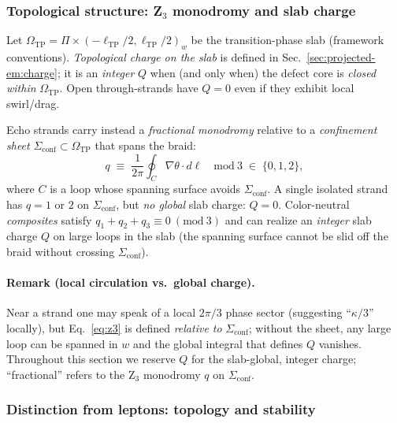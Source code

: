 \subsubsection{Topological structure: Z$_3$ monodromy and slab charge}
\label{sec:echo:topology}

Let $\Omega_{\mathrm{TP}}=\Pi\times(-\ell_{\mathrm{TP}}/2,\ell_{\mathrm{TP}}/2)_w$ be the transition-phase slab (framework conventions). \emph{Topological charge on the slab} is defined in Sec.~\ref{sec:projected-em:charge}; it is an \emph{integer} $Q$ when (and only when) the defect core is \emph{closed within} $\Omega_{\mathrm{TP}}$. Open through-strands have $Q=0$ even if they exhibit local swirl/drag.

Echo strands carry instead a \emph{fractional monodromy} relative to a \emph{confinement sheet} $\Sigma_{\mathrm{conf}}\subset\Omega_{\mathrm{TP}}$ that spans the braid:
\begin{equation}
q \;\equiv\; \frac{1}{2\pi}\oint_{C}\nabla\theta\!\cdot d\boldsymbol\ell \quad \mathrm{mod}\ 3 \;\in\;\{0,1,2\},
\label{eq:z3}
\end{equation}
where $C$ is a loop whose spanning surface avoids $\Sigma_{\mathrm{conf}}$. A single isolated strand has $q=1$ or $2$ on $\Sigma_{\mathrm{conf}}$, but \emph{no global} slab charge: $Q=0$. Color-neutral \emph{composites} satisfy $q_1+q_2+q_3\equiv 0\ (\mathrm{mod}\ 3)$ and can realize an \emph{integer} slab charge $Q$ on large loops in the slab (the spanning surface cannot be slid off the braid without crossing $\Sigma_{\mathrm{conf}}$).

\paragraph{Remark (local circulation vs.\ global charge).}
Near a strand one may speak of a local $2\pi/3$ phase sector (suggesting ``$\kappa/3$'' locally), but Eq.~\eqref{eq:z3} is defined \emph{relative to} $\Sigma_{\mathrm{conf}}$; without the sheet, any large loop can be spanned in $w$ and the global integral that defines $Q$ vanishes. Throughout this section we reserve $Q$ for the slab-global, integer charge; ``fractional'' refers to the Z$_3$ monodromy $q$ on $\Sigma_{\mathrm{conf}}$.

\subsubsection{Distinction from leptons: topology and stability}
\label{sec:echo:vs-leptons}

